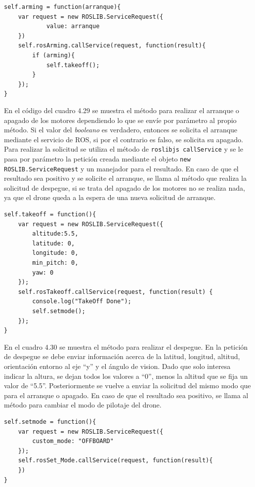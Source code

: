 \begin{lstlisting}[caption= Método para arrancar o apagar los motores del drone, label=cod.arming]
self.arming = function(arranque){
	var request = new ROSLIB.ServiceRequest({
			value: arranque
	})
	self.rosArming.callService(request, function(result){
		if (arming){
			self.takeoff();
		} 
	});
}
\end{lstlisting}

En el código del cuadro 4.29 se muestra el método para realizar el arranque o apagado de los motores dependiendo lo que se envíe por parámetro al propio método. Si el valor del \textit{booleano} es verdadero, entonces se solicita el arranque mediante el servicio de ROS, si por el contrario es falso, se solicita su apagado. Para realizar la solicitud se utiliza el método de \texttt{roslibjs callService} y se le pasa por parámetro la petición creada mediante el objeto \texttt{new ROSLIB.ServiceRequest} y un manejador para el resultado. En caso de que el resultado sea positivo y se solicite el arranque, se llama al método que realiza la solicitud de despegue, si se trata del apagado de los motores no se realiza nada, ya que el drone queda a la espera de una nueva solicitud de arranque.

\begin{lstlisting}[caption= Método para arrancar o apagar los motores del drone, label=cod.takeoff]
self.takeoff = function(){
	var request = new ROSLIB.ServiceRequest({
		altitude:5.5,
		latitude: 0,
		longitude: 0,
		min_pitch: 0,
		yaw: 0
	});
	self.rosTakeoff.callService(request, function(result) {
		console.log("TakeOff Done");
		self.setmode();
	});
}
\end{lstlisting}

En el cuadro 4.30 se muestra el método para realizar el despegue. En la petición de despegue se debe enviar información acerca de la latitud, longitud, altitud, orientación entorno al eje ``y'' y el ángulo de vision. Dado que solo interesa indicar la altura, se dejan todos los valores a ``0'', menos la altitud que se fija un valor de ``5.5''. Posteriormente se vuelve a enviar la solicitud del mismo modo que para el arranque o apagado. En caso de que el resultado sea positivo, se llama al método para cambiar el modo de pilotaje del drone.

\begin{lstlisting}[caption= Método para cambiar el modo de pilotaje, label=cod.setMode]
self.setmode = function(){
	var request = new ROSLIB.ServiceRequest({
		custom_mode: "OFFBOARD"
	});
	self.rosSet_Mode.callService(request, function(result){
	})
}
\end{lstlisting}


